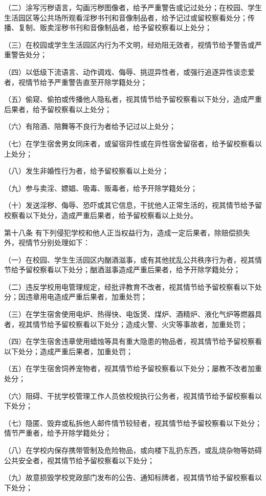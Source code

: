 \documentclass[UTF8,12pt,a4paper]{report}
\begin{document}
（二）涂写污秽语言，勾画污秽图像者，给予严重警告或记过处分；在校园、学生生活园区等公共场所观看淫秽书刊和音像制品者，给予记过或留校察看处分；传播、复制、贩卖淫秽书刊和音像制品者，给予留校察看以上处分； 

（三）在校园或学生生活园区内行为不文明，经劝阻无效者，视情节给予警告或严重警告处分；

（四）以低级下流语言、动作调戏、侮辱、挑逗异性者，或强行追逐异性谈恋爱者，视情节给予严重警告直至开除学籍处分；

（五）偷窥、偷拍或传播他人隐私者，视其情节给予留校察看以下处分，造成严重后果者，给予留校察看以上处分；

（六）有陪酒、陪舞等不良行为者给予记过以上处分；

（七）在学生宿舍男女同床者，或留宿异性或在异性宿舍留宿者，给予留校察看以上处分；

（八）发生非婚性行为者，给予留校察看以上处分；

（九）参与卖淫、嫖娼、吸毒、贩毒者，给予开除学籍处分；

（十）发送淫秽、侮辱、恐吓或其它信息，干扰他人正常生活的，视其情节给予留校察看以下处分，造成严重后果者，给予留校察看以上处分。

第十八条  有下列侵犯学校和他人正当权益行为，造成一定后果者，除赔偿损失外，视情节分别处理如下：

（一）在校园、学生生活园区内酗酒滋事，或有其他扰乱公共秩序行为者，视其情节给予留校察看以下处分；酗酒滋事造成严重后果者，给予开除学籍处分；

（二）违反学校用电管理规定，经批评教育不改者，视其情节给予留校察看以下处分；因违章用电造成严重后果者，加重处罚；

（三）在学生宿舍使用电炉、热得快、电饭煲、煤炉、酒精炉、液化气炉等燃器具者，视其情节给予留校察看以下处分；造成火警、火灾等事故者，加重处罚；

（四）在学生宿舍违章使用蜡烛等具有重大隐患的物品者，视其情节给予留校察看以下处分；造成严重后果者，加重处罚；

（五）在学生宿舍饲养宠物者，视其情节给予留校察看以下处分；屡教不改者加重处分；

（六）阻碍、干扰学校管理工作人员依校规执行公务者，视其情节给予留校察看以下处分；

（七）隐匿、毁弃或私拆他人邮件情节较轻者，视其情节给予留校察看以下处分；情节严重者，给予开除学籍处分；

（八）在学校内保存携带管制及危险物品，或向楼下乱扔东西，或乱烧杂物等妨碍公共安全者，视其情节给予留校察看以下处分；

（九）故意损毁学校党政部门发布的公告、通知标牌者，视其情节给予留校察看以下处分；
\end{document}
